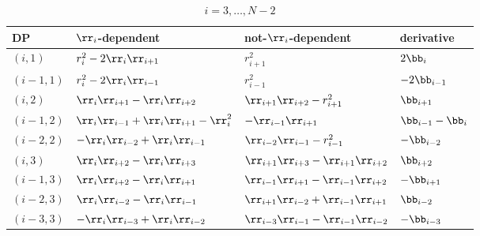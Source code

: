 \begin{table}[ht]
  \caption{$i=3,\ldots,N-2$}
  \centering
  \begin{tabular}{|p{2cm}|p{3cm}|p{4cm}|p{2cm}|}
\hline
    DP			& $\rr_i$-dependent 	& not-$\rr_i$-dependent & derivative \\
   \hline 
    $(i,1)$ 	& $r_i^2-2\rr_i\rr_{i+1}$ 	
    		& $r_{i+1}^2$ 
		& $2\bb_i$ \\
    \hline
    $(i-1,1)$ 	& $r_{i}^2-2\rr_{i}\rr_{i-1}$	
    		& $r_{i-1}^2$ 
		& $-2\bb_{i-1}$\\
    \hline
    $(i,2)$ 	& $\rr_i\rr_{i+1}-\rr_i\rr_{i+2}$  
    		& $\rr_{i+1}\rr_{i+2}-r_{i+1}^2$ 
		& $\bb_{i+1}$ \\
    \hline
    $(i-1,2)$ 	& $\rr_i\rr_{i-1}+\rr_i\rr_{i+1}-\rr_{i}^2$ 
    		& $-\rr_{i-1}\rr_{i+1}$ 
    		& $\bb_{i-1}-\bb_i$ \\
    \hline
    $(i-2,2)$ 	& $-\rr_i\rr_{i-2}+\rr_i\rr_{i-1}$ 
    		& $\rr_{i-2}\rr_{i-1}-r_{i-1}^2$ 
		& $-\bb_{i-2}$\\
    \hline
    $(i,3)$		& $\rr_i\rr_{i+2}-\rr_{i}\rr_{i+3}$	
    			& $\rr_{i+1}\rr_{i+3}-\rr_{i+1}\rr_{i+2}$ 
			& $\bb_{i+2}$ \\
    \hline
    $(i-1,3)$		& $\rr_i\rr_{i+2}-\rr_i\rr_{i+1} $   	
    			& $\rr_{i-1}\rr_{i+1}-\rr_{i-1}\rr_{i+2}$ 
			& $-\bb_{i+1}$ \\
    \hline
    $(i-2,3)$		& $\rr_i\rr_{i-2}-\rr_i\rr_{i-1}$ 	
    			& $\rr_{i+1}\rr_{i-2}+\rr_{i-1}\rr_{i+1}$ 
			& $\bb_{i-2}$ \\
    \hline
    $(i-3,3)$		& $-\rr_i\rr_{i-3}+\rr_i\rr_{i-2}$ 
    			& $\rr_{i-3}\rr_{i-1}-\rr_{i-1}\rr_{i-2}$
			& $-\bb_{i-3}$	\\
\hline
  \end{tabular}
\end{table}
\clearpage
